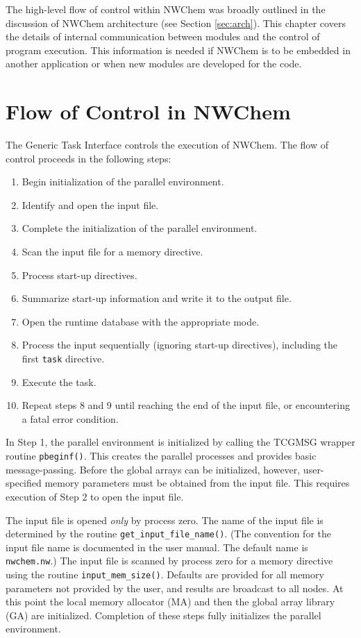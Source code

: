 \label{sec:generic}

The high-level flow of control within NWChem was broadly outlined in
the discussion of NWChem architecture (see Section \ref{sec:arch}).  This 
chapter covers the details of internal communication between modules
and the control of program execution.  This information is needed if
NWChem is to be embedded in another application or when new modules
are developed for the code.

\section{Flow of Control in NWChem}

The Generic Task Interface controls the execution of NWChem.  The flow 
of control proceeds in the following steps:

\begin{enumerate}
\item Begin initialization of the parallel environment.
\item Identify and open the input file.
\item Complete the initialization of the parallel environment.
\item Scan the input file for a memory directive.
\item Process start-up directives.
\item Summarize start-up information and write it to the output file.
\item Open the runtime database with the appropriate mode.
\item Process the input sequentially (ignoring start-up directives), 
including the first \verb+task+ directive.
\item Execute the task.
\item Repeat steps 8 and 9 until reaching the end of the input file, or
encountering a fatal error condition.
\end{enumerate}

In Step 1, the parallel environment is initialized by calling the 
TCGMSG wrapper routine \verb+pbeginf()+.  This creates the parallel processes 
and provides basic message-passing.  Before the global arrays can be 
initialized, however, user-specified memory parameters must be obtained 
from the input file.  This requires execution of Step 2 to open the input file.

The input file is opened {\em only} by process zero.
The name of the input file is determined by the routine 
\verb+get_input_file_name()+.  (The convention for the input file name is 
documented in the user manual.  The default name is \verb+nwchem.nw+.)
The input file is scanned by process zero for a memory directive using the
routine \verb+input_mem_size()+.  Defaults are provided for all memory parameters 
not provided by the user, and results are broadcast to all nodes.  At this point the 
local memory allocator (MA) and then the global array library (GA) are initialized.  
Completion of these steps fully initializes the parallel environment.

